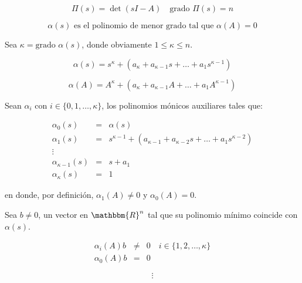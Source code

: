         \begin{equation}
            \Pi(s) = \det{(sI - A)} \quad \text{grado } \Pi(s) = n \nonumber
        \end{equation}

        \begin{equation}
            \alpha(s) \text{ es el polinomio de menor grado tal que } \alpha(A) = 0 \nonumber
        \end{equation}

        Sea $\kappa = \text{grado } \alpha(s)$, donde obviamente $1 \le \kappa \le n$.

        \begin{equation}
            \alpha(s) = s^{\kappa} + (a_{\kappa} + a_{\kappa - 1} s + \dots + a_1 s^{\kappa - 1}) \nonumber
        \end{equation}

        \begin{equation}
            \alpha(A) = A^{\kappa} + (a_{\kappa} + a_{\kappa - 1} A + \dots + a_1 A^{\kappa - 1}) \nonumber
        \end{equation}

        Sean $\alpha_i$ con $i \in \{ 0, 1, \dots, \kappa \}$, los polinomios mónicos auxiliares tales que:

        \begin{eqnarray}
        \alpha_0(s) & = & \alpha(s) \nonumber \\
        \alpha_1(s) & = & s^{\kappa - 1} + (a_{\kappa - 1} + a_{\kappa - 2} s + \dots + a_1 s^{\kappa - 2}) \nonumber \\
        \vdots \nonumber \\
        \alpha_{\kappa - 1}(s) & = & s + a_1 \nonumber \\
        \alpha_{\kappa}(s) & = & 1 \nonumber
        \end{eqnarray}

        en donde, por definición, $\alpha_1(A) \ne 0$ y $\alpha_0(A) = 0$.

        Sea $b \ne 0$, un vector en $\mathbbm{R}^n$ tal que su polinomio mínimo coincide con $\alpha(s)$.

        \begin{eqnarray}
        \alpha_i(A) b & \ne & 0 \quad i \in \{ 1, 2, \dots, \kappa \} \nonumber \\
        \alpha_0(A) b & = & 0 \nonumber
        \end{eqnarray}

        \begin{equation}
            \vdots \nonumber
        \end{equation}

